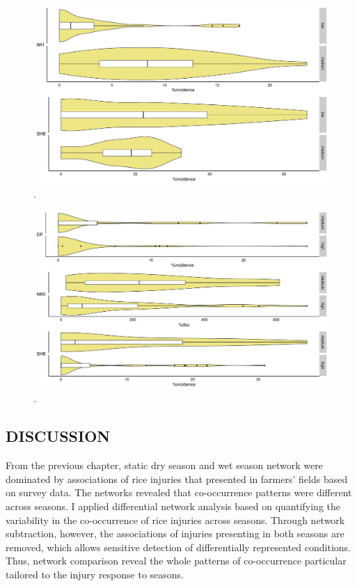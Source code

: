 \begin{figure}
        \includegraphics[width = 1\textwidth]{figures/TM_yield_box.pdf}
        \caption{.}
\label{fig:yield.box_TM}
\end{figure}

\begin{figure}
        \includegraphics[width = 1\textwidth]{figures/WJ_yield_box.pdf}
        \caption{.}
\label{fig:yield.box_WJ}
\end{figure}


\clearpage
\subsection{DISCUSSION}

From the previous chapter, static dry season and wet season network were dominated by  associations of rice injuries that presented in farmers' fields based on survey data. The networks revealed that co-occurrence patterns were different across seasons. I applied differential network analysis based on quantifying the variability in the co-occurrence of rice injuries across seasons. Through network subtraction, however, the associations of injuries presenting in both seasons are removed, which allows sensitive detection of differentially represented conditions. Thus, network comparison reveal the whole patterns of co-occurrence particular tailored to the injury response to seasons.


